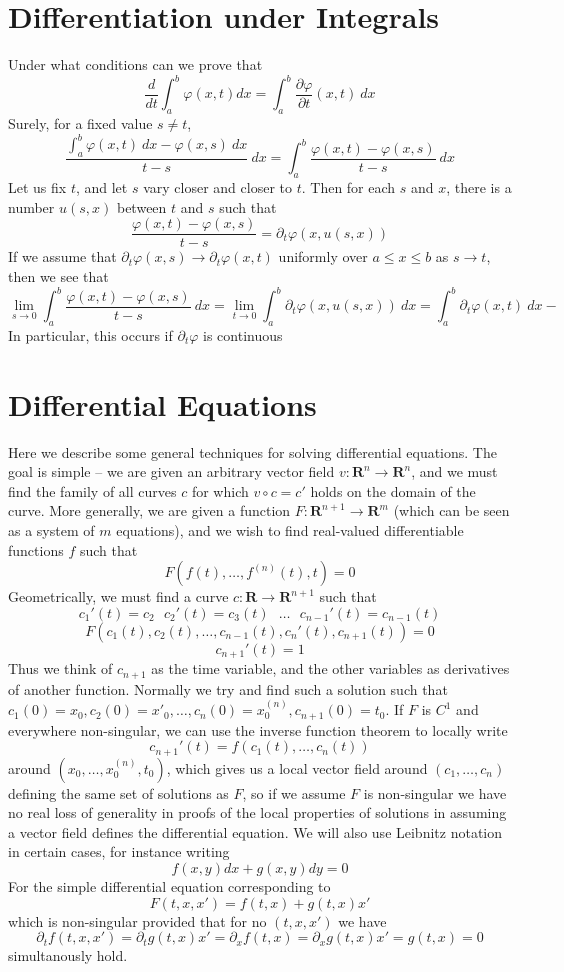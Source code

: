 \chapter{Differentiation under Integrals}

Under what conditions can we prove that
%
\[ \frac{d}{dt} \int_a^b \varphi(x,t) dx = \int_a^b \frac{\partial \varphi}{\partial t}(x,t)\ dx \]
%
Surely, for a fixed value $s \neq t$,
%
\[ \frac{\int_a^b \varphi(x,t)\ dx - \varphi(x,s)\ dx}{t - s}\ dx = \int_a^b \frac{\varphi(x,t) - \varphi(x,s)}{t - s}\ dx \]
%
Let us fix $t$, and let $s$ vary closer and closer to $t$. Then for each $s$ and $x$, there is a number $u(s,x)$ between $t$ and $s$ such that
%
\[ \frac{\varphi(x,t) - \varphi(x,s)}{t - s} = \partial_t \varphi(x,u(s,x)) \]
%
If we assume that $\partial_t \varphi(x,s) \to \partial_t \varphi(x,t)$ uniformly over $a \leq x \leq b$ as $s \to t$, then we see that
%
\[ \lim_{s \to 0} \int_a^b \frac{\varphi(x,t) - \varphi(x,s)}{t - s}\ dx = \lim_{t \to 0} \int_a^b \partial_t \varphi(x,u(s,x))\ dx = \int_a^b \partial_t \varphi(x,t)\ dx- \]
%
In particular, this occurs if $\partial_t \varphi$ is continuous

\chapter{Differential Equations}

Here we describe some general techniques for solving differential equations. The goal is simple -- we are given an arbitrary vector field $v: \mathbf{R}^n \to \mathbf{R}^n$, and we must find the family of all curves $c$ for which $v \circ c = c'$ holds on the domain of the curve. More generally, we are given a function $F: \mathbf{R}^{n+1} \to \mathbf{R}^m$ (which can be seen as a system of $m$ equations), and we wish to find real-valued differentiable functions $f$ such that
%
\[ F(f(t), \dots, f^{(n)}(t), t) = 0 \]
%
Geometrically, we must find a curve $c: \mathbf{R} \to \mathbf{R}^{n+1}$ such that
%
\[ c_1'(t) = c_2\ \ \ c_2'(t) = c_3(t)\ \ \ \dots\ \ \ c_{n-1}'(t) = c_{n-1}(t) \]
\[ F(c_1(t), c_2(t), \dots, c_{n-1}(t), c_n'(t), c_{n+1}(t)) = 0 \]
\[ c_{n+1}'(t) = 1 \]
%
Thus we think of $c_{n+1}$ as the time variable, and the other variables as derivatives of another function. Normally we try and find such a solution such that $c_1(0) = x_0, c_2(0) = x'_0, \dots, c_n(0) = x^{(n)}_0, c_{n+1}(0) = t_0$. If $F$ is $C^1$ and everywhere non-singular, we can use the inverse function theorem to locally write
%
\[ c_{n+1}'(t) = f(c_1(t), \dots, c_n(t)) \]
%
around $(x_0, \dots, x^{(n)}_0, t_0)$, which gives us a local vector field around $(c_1, \dots, c_n)$ defining the same set of solutions as $F$, so if we assume $F$ is non-singular we have no real loss of generality in proofs of the local properties of solutions in assuming a vector field defines the differential equation. We will also use Leibnitz notation in certain cases, for instance writing
%
\[ f(x,y) dx + g(x,y) dy = 0 \]
%
For the simple differential equation corresponding to
%
\[ F(t,x,x') = f(t,x) + g(t,x) x' \]
%
which is non-singular provided that for no $(t,x,x')$ we have
%
\[ \partial_t f(t,x,x') = \partial_t g(t,x) x' = \partial_x f(t,x) = \partial_x g(t,x) x' = g(t,x) = 0 \]
%
simultanously hold.


